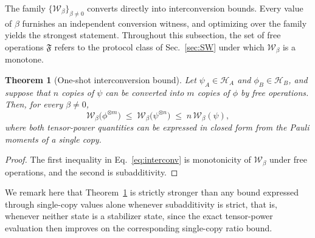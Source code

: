 \documentclass[aps,pra,superscriptaddress,twocolumn,longbibliography]{revtex4-2}
\newtheorem{theorem}{\textbf{Theorem}}
\def\mH{\mathcal{H}}
\def\mf{\mathfrak{F}}
\begin{document}
The family $\{\mathcal{W}_\beta\}_{\beta\neq0}$ converts directly into interconversion bounds.
Every value of $\beta$ furnishes an independent conversion witness, and optimizing over the family yields the strongest statement. 
Throughout this subsection, the set of free operations $\mf$ refers to the protocol class of Sec.~\ref{sec:SW} under which $\mathcal{W}_\beta$ is a monotone.

\begin{theorem}[One-shot interconversion bound]
\label{thm:interconversion}
Let $\psi_A\in \mH_A$ and $\phi_B\in \mH_B$, and suppose that $n$ copies of $\psi$ can be converted into $m$ copies of $\phi$ by free operations. 
Then, for every $\beta\neq0$,
\begin{equation}
\mathcal{W}_\beta\!\big(\phi^{\otimes m}\big)\;\le\;
\mathcal{W}_\beta\!\big(\psi^{\otimes n}\big)\;\le\;
n\,\mathcal{W}_\beta(\psi),
\label{eq:interconv}
\end{equation}
where both tensor-power quantities can be expressed in closed form from the Pauli moments of a single copy.
\end{theorem}

\begin{proof}
The first inequality in Eq.~\eqref{eq:interconv} is monotonicity of
$\mathcal{W}_\beta$ under free operations, and the second is
subadditivity.
\end{proof}

We remark here that Theorem~\ref{thm:interconversion} is strictly stronger than any bound expressed through single-copy values alone whenever subadditivity is strict, that is, whenever neither state is a stabilizer state, since the exact tensor-power evaluation then improves on the corresponding single-copy ratio bound.
\end{document}
